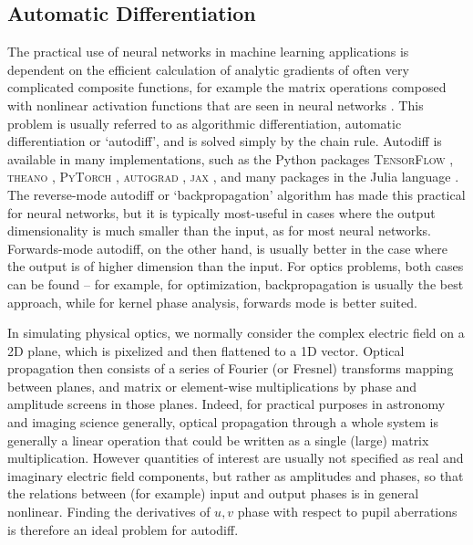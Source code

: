 \documentclass[modern]{aastex63}
\begin{document}
\subsection{Automatic Differentiation}
The practical use of neural networks in machine learning applications is dependent on the efficient calculation of analytic gradients of often very complicated composite functions, for example the matrix operations composed with nonlinear activation functions that are seen in neural networks \citep{lecun15}. This problem is usually referred to as algorithmic differentiation, automatic differentiation or `autodiff', and is solved simply by the chain rule.
Autodiff is available in many implementations, such as the Python packages \textsc{TensorFlow} \citep{tensorflow2015}, \textsc{theano} \citep{theano}, \textsc{PyTorch} \citep{pytorch}, \textsc{autograd} \citep{autograd}, \textsc{jax} \citep{jax}, and many packages in the Julia language \citep{julia}. The reverse-mode autodiff or `backpropagation' algorithm \citep{linnainmaa1970,lecun1988theoretical} has made this practical for neural networks, but it is typically most-useful in cases where the output dimensionality is much smaller than the input, as for most neural networks. Forwards-mode autodiff, on the other hand, is usually better in the case where the output is of higher dimension than the input. For optics problems, both cases can be found -- for example, for optimization, backpropagation is usually the best approach, while for kernel phase analysis, forwards mode is better suited.

In simulating physical optics, we normally consider the complex electric field on a 2D plane, which is pixelized and then flattened to a 1D vector.
Optical propagation then consists of a series of Fourier (or  Fresnel) transforms mapping between planes, and matrix or element-wise multiplications by phase and amplitude screens in those planes. Indeed, for practical purposes in astronomy and imaging science generally, optical propagation through a whole system is generally a linear operation that could be written as a single (large) matrix multiplication. However quantities of interest are usually not specified as real and imaginary electric field components, but rather as amplitudes and phases, so that the relations between (for example) input and output phases is in general nonlinear. Finding the derivatives of $u,v$ phase with respect to pupil aberrations is therefore an ideal problem for autodiff.
\end{document}
